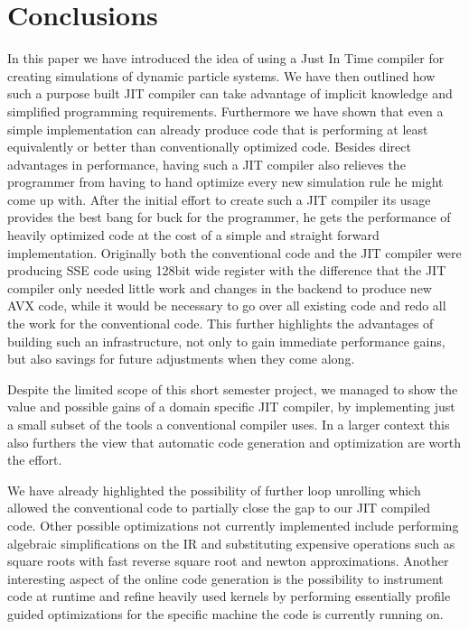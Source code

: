 \section{Conclusions}

In this paper we have introduced the idea of using a Just In Time compiler for creating simulations of dynamic particle systems. We have then outlined how such a purpose built JIT compiler can take advantage of implicit knowledge and simplified programming requirements. Furthermore we have shown that even a simple implementation can already produce code that is performing at least equivalently or better than conventionally optimized code. Besides direct advantages in performance, having such a JIT compiler also relieves the programmer from having to hand optimize every new simulation rule he might come up with. After the initial effort to create such a JIT compiler its usage provides the best bang for buck for the programmer, he gets the performance of heavily optimized code at the cost of a simple and straight forward implementation. Originally both the conventional code and the JIT compiler were producing SSE code using 128bit wide register with the difference that the JIT compiler only needed little work and changes in the backend to produce new AVX code, while it would be necessary to go over all existing code and redo all the work for the conventional code. This further highlights the advantages of building such an infrastructure, not only to gain immediate performance gains, but also savings for future adjustments when they come along.

Despite the limited scope of this short semester project, we managed to show the value and possible gains of a domain specific JIT compiler, by implementing just a small subset of the tools a conventional compiler uses. In a larger context this also furthers the view that automatic code generation and optimization are worth the effort.

We have already highlighted the possibility of further loop unrolling which allowed the conventional code to partially close the gap to our JIT compiled code. Other possible optimizations not currently implemented include performing algebraic simplifications on the IR and substituting expensive operations such as square roots with fast reverse square root and newton approximations. Another interesting aspect of the online code generation is the possibility to instrument code at runtime and refine heavily used kernels by performing essentially profile guided optimizations for the specific machine the code is currently running on.
